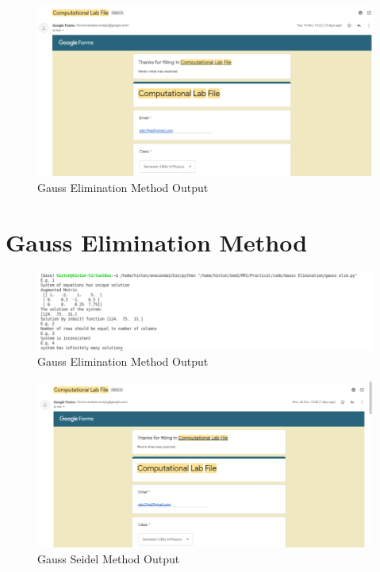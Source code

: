 \documentclass{article}
\begin{document}
\clearpage
\begin{figure}[h]
    \centering
    \includegraphics[width=14cm,height=5cm \textwidth]{7.PNG}
\caption{Gauss Elimination Method Output}
\end{figure}
\section{Gauss Elimination Method}


\begin{figure}[h]
    \centering
    \includegraphics[width=14cm,height=5cm \textwidth]{Gauss_Elimination/Capture.PNG}
\caption{Gauss Elimination Method Output}
\end{figure}


\clearpage
\begin{figure}[h]
    \centering
    \includegraphics[width=15cm,height=8cm \textwidth]{8.PNG}
\caption{Gauss Seidel Method Output}
\end{figure}
\end{document}
